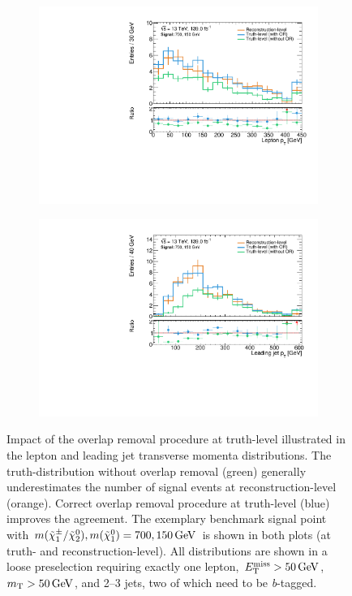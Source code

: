  \begin{figure}
	\centering
	\begin{subfigure}[b]{0.45\linewidth}
		\centering\includegraphics[width=\textwidth]{20210324_noLabel_noOR/700_150/lep1Pt_C1N2_Wh_hbb_700p0_150p0_smeared.pdf}
	\end{subfigure}\hfill
	\begin{subfigure}[b]{0.45\linewidth}
		\centering\includegraphics[width=\textwidth]{20210324_noLabel_noOR/700_150/jet1Pt_C1N2_Wh_hbb_700p0_150p0_smeared.pdf}
	\end{subfigure}\hfill
	\caption{Impact of the overlap removal procedure at truth-level illustrated in the lepton and leading jet transverse momenta distributions. The truth-distribution without overlap removal (green) generally underestimates the number of signal events at reconstruction-level (orange). Correct overlap removal procedure at truth-level (blue) improves the agreement. The exemplary benchmark signal point with $m(\charg/\neutr), m(\lsp) = 700, \SI{150}{\GeV}$ is shown in both plots (at truth- and reconstruction-level). All distributions are shown in a loose preselection requiring exactly one lepton, $\met>\SI{50}{\GeV}$, $\mt > \SI{50}{\GeV}$, and 2--3 jets, two of which need to be \textit{b}-tagged.}
	\label{fig:overlap_removal_truth}
\end{figure}

